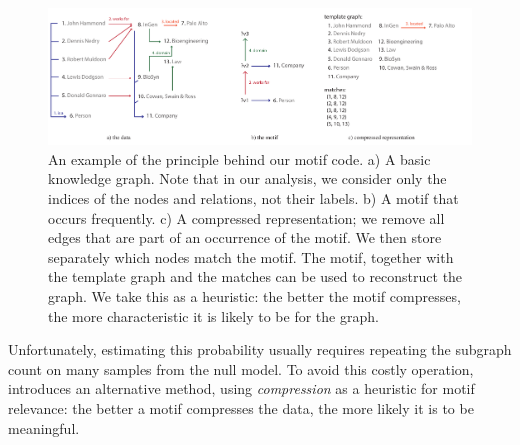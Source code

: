 \documentclass[letterpaper]{article} %
\begin{document}
\begin{figure}[bth]
  \centering
    \includegraphics[width=\textwidth]{example.pdf}
    \caption{An example of the principle behind our motif code. a) A basic knowledge graph. Note that in our analysis, we consider only the indices of the nodes and relations, not their labels. b) A motif that occurs frequently. c) A compressed representation; we remove all edges that are part of an occurrence of the motif. We then store separately which nodes match the motif. The motif, together with the template graph and the matches can be used to reconstruct the graph. We take this as a heuristic: the better the motif compresses, the more characteristic it is likely to be for the graph.}
    \label{figure:example}
  \label{figure:codes}
\end{figure}

Unfortunately, estimating this probability usually requires repeating the subgraph count on many samples from the null model. To avoid this costly operation, \cite{bloem2017large} introduces  an alternative method, using \emph{compression} as a heuristic for motif relevance: the better a motif compresses the data, the more likely it is to be meaningful. 


\end{document}
